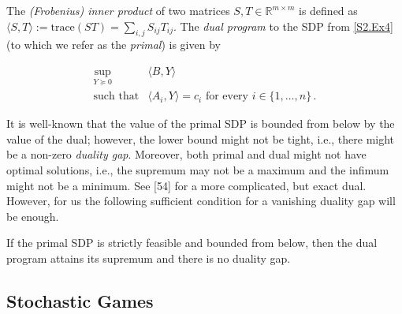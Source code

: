 The \emph{(Frobenius) inner product} of two matrices $S,T\in{\mathbb{R}}^{m\times m}$ is defined as $\langle S,T\rangle:=\text{trace}(ST)=\sum_{i,j}S_{ij}T_{ij}$. The \emph{dual program} to the SDP from \eqref{S2.Ex4} (to which we refer as the \emph{primal}) is given by


\begin{equation}\tag{D}\label{S2.Ex6}
\begin{aligned}
\displaystyle\sup_{Y\succeq 0} & \displaystyle\langle B,Y\rangle \\
\text{such that} & \displaystyle\langle A_{i},Y\rangle=c_{i}\text{ for every }i\in\{1,\dots,n\}\,.
\end{aligned}
\end{equation}

It is well-known that the value of the primal SDP is bounded from below by the value of the dual; however, the lower bound might not be tight, i.e., there might be a non-zero \emph{duality gap}. Moreover, both primal and dual might not have optimal solutions, i.e., the supremum may not be a maximum and the infimum might not be a minimum. See [54] for a more complicated, but exact dual. However, for us the following sufficient condition for a vanishing duality gap will be enough.

\setcounter{theorem}{1}
\begin{theorem}\label{Thmtheorem2}
If the primal SDP is strictly feasible and bounded from below, then the dual program attains its supremum and there is no duality gap.

\end{theorem}

\subsection*{Stochastic Games}

